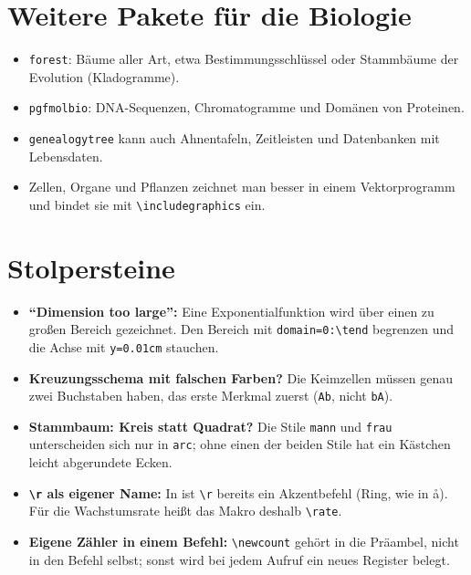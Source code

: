 \section{Weitere Pakete für die Biologie}

\begin{itemize}
	\item \texttt{forest}: Bäume aller Art, etwa Bestimmungsschlüssel oder Stammbäume der Evolution (Kladogramme).
	\item \texttt{pgfmolbio}: DNA-Sequenzen, Chromatogramme und Domänen von Proteinen.
	\item \texttt{genealogytree} kann auch Ahnentafeln, Zeitleisten und Datenbanken mit Lebensdaten.
	\item Zellen, Organe und Pflanzen zeichnet man besser in einem Vektorprogramm und bindet sie mit \texttt{\textbackslash includegraphics} ein.
\end{itemize}



\section{Stolpersteine}

\begin{itemize}
	\item \textbf{\enquote{Dimension too large}:} Eine Exponentialfunktion wird über einen zu großen Bereich gezeichnet. Den Bereich mit \texttt{domain=0:\textbackslash tend} begrenzen und die Achse mit \texttt{y=0.01cm} stauchen.
	\item \textbf{Kreuzungsschema mit falschen Farben?} Die Keimzellen müssen genau zwei Buchstaben haben, das erste Merkmal zuerst (\texttt{Ab}, nicht \texttt{bA}).
	\item \textbf{Stammbaum: Kreis statt Quadrat?} Die Stile \texttt{mann} und \texttt{frau} unterscheiden sich nur in \texttt{arc}; ohne einen der beiden Stile hat ein Kästchen leicht abgerundete Ecken.
	\item \textbf{\texttt{\textbackslash r} als eigener Name:} In  ist \texttt{\textbackslash r} bereits ein Akzentbefehl (Ring, wie in \r{a}). Für die Wachstumsrate heißt das Makro deshalb \texttt{\textbackslash rate}.
	\item \textbf{Eigene Zähler in einem Befehl:} \texttt{\textbackslash newcount} gehört in die Präambel, nicht in den Befehl selbst; sonst wird bei jedem Aufruf ein neues Register belegt.
\end{itemize}



